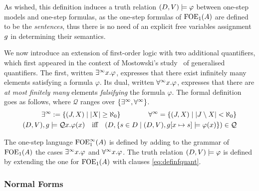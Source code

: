 As wished, this definition induces a truth relation $(D, V) \models \varphi$ between one-step models and one-step formulas, as the one-step formulas of $\mathrm{FOE}_1(A)$ are defined to be the \emph{sentences}, thus there is no need of an explicit free variables assignment $g$ in determining their semantics.

We now introduce an extension of first-order logic with two additional quantifiers, which first appeared in the context of Mostowski's study~\cite{Mostowski1957} of generalised quantifiers. The first, written $\exists^\infty x. \varphi$, expresses that there exist infinitely many elements satisfying a formula $\varphi$. Its dual, written $\forall^\infty x. \varphi$, expresses that there are \emph{at most finitely many} elements \emph{falsifying} the formula $\varphi$. The formal definition goes as follows, where $\mathcal Q$ ranges over $\{\exists^\infty, \forall^\infty\}$.
\begin{equation}\label{eq:definfquant}
\begin{aligned}
\qu := \{(J,X) \mid |X| \geq \aleph_0\} \qquad \qquad \dqu =\{(J,X) \mid |J\setminus X| < \aleph_0\} \\
(D,V),\ass \models {\mathcal Q}x. \phi(x) \quad\text{iff}\quad (D , \{s\in D \mid (D, \val),\ass[x\mapsto s] \models \phi(x) \}) \in {\mathcal Q}
\end{aligned}
\end{equation}

\begin{definition}
The one-step language $\mathrm{FOE}^{\infty}_1(A)$ is defined by adding to the grammar of $\mathrm{FOE}_1(A)$ the cases $\exists^\infty x. \varphi$ and $\forall^\infty x. \varphi$. The truth relation $(D, V) \models \varphi$ is defined by extending the one for $\mathrm{FOE}_1(A)$ with clauses \eqref{eq:definfquant}.
\end{definition}


\subsubsection{Normal Forms}

